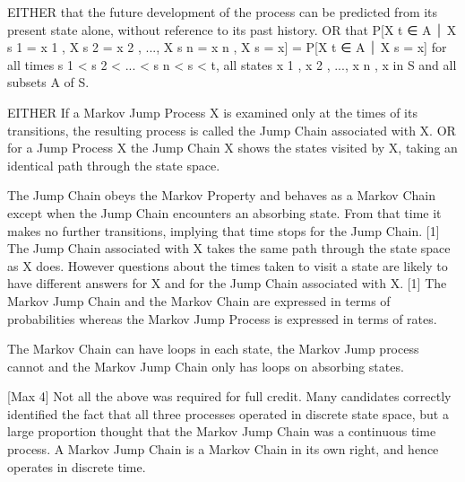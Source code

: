 EITHER that the future development of the process can be predicted from its present state
alone, without reference to its past history.
OR that
P[X t ∈ A ⏐ X s 1 = x 1 , X s 2 = x 2 , ..., X s n = x n , X s = x] = P[X t ∈ A ⏐ X s = x]
for all times s 1 < s 2 < ... < s n < s < t, all states x 1 , x 2 , ..., x n , x in S and all subsets A of S.

EITHER If a Markov Jump Process X is examined only at the times of its transitions, the
resulting process is called the Jump Chain associated with X.
OR for a Jump Process X the Jump Chain X shows the states visited by X, taking an identical
path through the state space.

The Jump Chain obeys the Markov Property and behaves as a Markov Chain except when the
Jump Chain encounters an absorbing state. From that time it makes no further transitions,
implying that time stops for the Jump Chain.
[1]
The Jump Chain associated with X takes the same path through the state space as X does.
However questions about the times taken to visit a state are likely to have different answers
for X and for the Jump Chain associated with X.
[1]
The Markov Jump Chain and the Markov Chain are expressed in terms of probabilities
whereas the Markov Jump Process is expressed in terms of rates.

The Markov Chain can have loops in each state, the Markov Jump process cannot and the
Markov Jump Chain only has loops on absorbing states.

[Max 4]
Not all the above was required for full credit. Many candidates correctly
identified the fact that all three processes operated in discrete state space,
but a large proportion thought that the Markov Jump Chain was a continuous
time process. A Markov Jump Chain is a Markov Chain in its own right, and
hence operates in discrete time.
